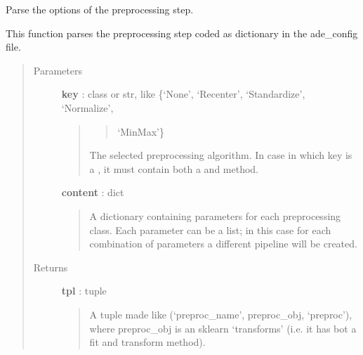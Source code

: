 \documentclass[letterpaper,10pt,english]{sphinxmanual}
\begin{document}

\begin{fulllineitems}
\label{index:adenine.core.define_pipeline.parse_preproc}
Parse the options of the preprocessing step.

This function parses the preprocessing step coded as dictionary in the
ade\_config file.
\begin{quote}\begin{description}
\item[{Parameters}] \leavevmode
\textbf{key} : class or str, like \{`None', `Recenter', `Standardize', `Normalize',
\begin{quote}
\begin{quote}

`MinMax'\}
\end{quote}

The selected preprocessing algorithm. In case in which key
is a , it must contain both a  and  method.
\end{quote}

\textbf{content} : dict
\begin{quote}

A dictionary containing parameters for each preprocessing
class. Each parameter can be a list; in this case for each combination
of parameters a different pipeline will be created.
\end{quote}

\item[{Returns}] \leavevmode
\textbf{tpl} : tuple
\begin{quote}

A tuple made like (`preproc\_name', preproc\_obj, `preproc'), where
preproc\_obj is an sklearn `transforms' (i.e. it has bot a fit and
transform method).
\end{quote}

\end{description}\end{quote}

\end{fulllineitems}

\end{document}
